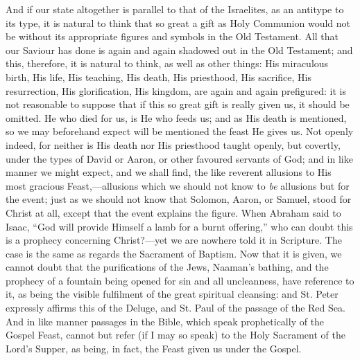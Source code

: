 And if our state altogether is parallel to that of the Israelites,
as an antitype to its type, it is natural to think that so great a
gift as Holy Communion would not be without its appropriate figures
and symbols in the Old Testament. All that our Saviour has done is
again and again shadowed out in the Old Testament; and this,
therefore, it is natural to think, as well as other things: His
miraculous birth, His life, His teaching, His death, His priesthood,
His sacrifice, His resurrection, His glorification, His kingdom, are
again and again prefigured: it is not reasonable to suppose that if
this so great gift is really given us, it should be omitted. He who
died for us, is He who feeds us; and as His death is mentioned, so we
may beforehand expect will be mentioned the feast He gives us. Not
openly indeed, for neither is His death nor His priesthood taught
openly, but covertly, under the types of David or Aaron, or other
favoured servants of God; and in like manner we might expect, and we
shall find, the like reverent allusions to His most gracious Feast,—allusions
which we should not know to \emph{be} allusions but for the event;
just as we should not know that Solomon, Aaron, or Samuel, stood for
Christ at all, except that the event explains the figure. When Abraham
said to Isaac, ``God will provide Himself a lamb for a burnt
offering,'' who can doubt this is a prophecy concerning Christ?—yet
we are nowhere told it in Scripture. The case is the same as regards
the Sacrament of Baptism. Now that it is given, we cannot doubt that
the purifications of the Jews, Naaman's bathing, and the prophecy of a
fountain being opened for sin and all uncleanness, have reference to
it, as being the visible fulfilment of the great spiritual cleansing:
and St. Peter expressly affirms this of the Deluge, and St. Paul of
the passage of the Red Sea. And in like manner passages in the Bible,
which speak prophetically of the Gospel Feast, cannot but refer (if I
may so speak) to the Holy Sacrament of the Lord's Supper, as being, in
fact, the Feast given us under the Gospel.

